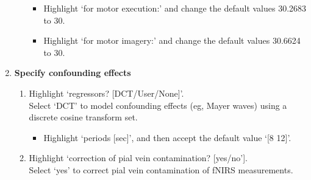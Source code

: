 \begin{enumerate}
\begin{enumerate}
\begin{itemize} 
\item Highlight `for motor execution:' and change the default values 30.2683 to 30. 
\item Highlight `for motor imagery:' and change the default values 30.6624 to 30. 
\end{itemize}
\end{enumerate}
\item \textbf{Specify confounding effects}
\begin{enumerate}
\item Highlight `regressors? [DCT/User/None]'. \\ Select `DCT' to model confounding effects (eg, Mayer waves) using a discrete cosine transform set. 
\begin{itemize}
\item Highlight `periods [sec]', and then accept the default value `[8 12]'. 
\end{itemize}
\item Highlight `correction of pial vein contamination? [yes/no'].\\ Select `yes' to correct pial vein contamination of fNIRS measurements.
\end{enumerate}


\end{enumerate}
